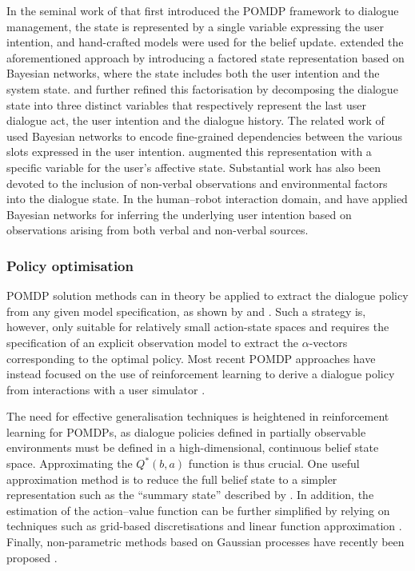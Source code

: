 In the seminal work of \cite{Roy:2000} that first introduced the POMDP framework to dialogue management, the state is represented by a single variable expressing the user intention, and hand-crafted models were used for the belief update. \cite{zhang2001} extended the aforementioned approach by introducing a factored state representation based on Bayesian networks, where the state includes both the user intention and the system state. \cite{williams2005factored} and \cite{Young:2010} further refined this factorisation by decomposing the dialogue state into three distinct variables that respectively represent the last user dialogue act, the user intention and the dialogue history. The related work of \cite{Thomson:2010:BUD:1772996.1773040} used Bayesian networks to encode fine-grained dependencies between the various slots expressed in the user intention. \cite{bui2009} augmented this representation with a specific variable for the user's affective state. Substantial work has also been devoted to the inclusion of non-verbal observations and environmental factors into the dialogue state. In the human--robot interaction domain, \cite{prodanov2003bayesian} and \cite{Hong:2007} have applied Bayesian networks for inferring the underlying user intention based on observations arising from both verbal and non-verbal sources. 

\subsubsection*{Policy optimisation}

POMDP solution methods can in theory be applied to extract the dialogue policy from any given model specification, as shown by \cite{Williams:2007} and \cite{Williamsetal:2008}.  Such a strategy is, however, only suitable for relatively small action-state spaces and requires the specification of an explicit observation model to extract the $\alpha$-vectors corresponding to the optimal policy. Most recent POMDP approaches have instead focused on the use of reinforcement learning to derive a dialogue policy from interactions with a user simulator \citep{Young:2010,Thomson:2010:BUD:1772996.1773040, daubigney2012}.

The need for effective generalisation techniques is heightened in reinforcement learning for POMDPs, as dialogue policies defined in partially observable environments must be defined in a high-dimensional, continuous belief state space.  Approximating the $Q^*(b,a)$ function is thus crucial. One useful approximation method is to reduce the full belief state to a simpler representation such as the ``summary state'' described by \cite{williams2005}. In addition, the estimation of the action--value function can be further simplified by relying on techniques such as grid-based discretisations \citep{Young:2010} and linear function approximation  \citep{Thomson:2010:BUD:1772996.1773040, daubigney2012}. Finally, non-parametric methods based on Gaussian processes have recently been proposed \citep{milica2013}. 


